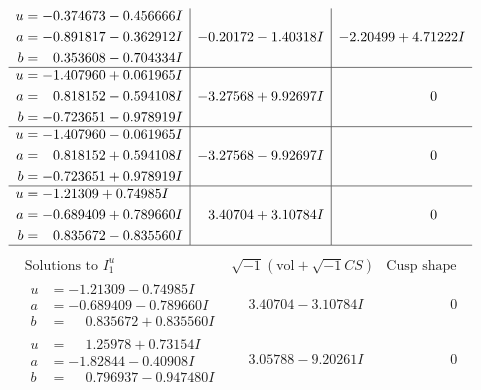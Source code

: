 \documentclass[1p]{elsarticle_modified}
\theoremstyle{definition}
\newcommand{\I}{\sqrt{-1}}
\begin{document}
$$\begin{array}{c|c|c}
\begin{aligned}
u &= -0.374673 - 0.456666 I \\
a &= -0.891817 - 0.362912 I \\
b &= \phantom{-}0.353608 - 0.704334 I\end{aligned}
 & -0.20172 - 1.40318 I & -2.20499 + 4.71222 I \\ \hline\begin{aligned}
u &= -1.407960 + 0.061965 I \\
a &= \phantom{-}0.818152 - 0.594108 I \\
b &= -0.723651 - 0.978919 I\end{aligned}
 & -3.27568 + 9.92697 I & \phantom{-0.000000 } 0 \\ \hline\begin{aligned}
u &= -1.407960 - 0.061965 I \\
a &= \phantom{-}0.818152 + 0.594108 I \\
b &= -0.723651 + 0.978919 I\end{aligned}
 & -3.27568 - 9.92697 I & \phantom{-0.000000 } 0 \\ \hline\begin{aligned}
u &= -1.21309 + 0.74985 I \\
a &= -0.689409 + 0.789660 I \\
b &= \phantom{-}0.835672 - 0.835560 I\end{aligned}
 & \phantom{-}3.40704 + 3.10784 I & \phantom{-0.000000 } 0\\
 \hline 
 \end{array}$$\newpage$$\begin{array}{c|c|c}  
\text{Solutions to }I^u_{1}& \I (\text{vol} + \sqrt{-1}CS) & \text{Cusp shape}\\
 \hline 
\begin{aligned}
u &= -1.21309 - 0.74985 I \\
a &= -0.689409 - 0.789660 I \\
b &= \phantom{-}0.835672 + 0.835560 I\end{aligned}
 & \phantom{-}3.40704 - 3.10784 I & \phantom{-0.000000 } 0 \\ \hline\begin{aligned}
u &= \phantom{-}1.25978 + 0.73154 I \\
a &= -1.82844 - 0.40908 I \\
b &= \phantom{-}0.796937 - 0.947480 I\end{aligned}
 & \phantom{-}3.05788 - 9.20261 I & \phantom{-0.000000 } 0 \\ \hline\begin{aligned}

\end{aligned}
\end{array}$$
\end{document}
